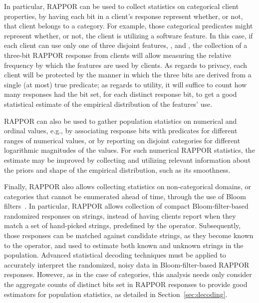 \documentclass{sig-alternate-2013}
\newcommand\RAPPOR{{RAPPOR}}
\begin{document}
In particular,
\RAPPOR{} can be used to
collect 
statistics on 
categorical client properties,
by having each bit in a client's response
represent whether, or not, that client belongs to a category.
For example, those categorical predicates 
might represent 
whether, or not, the client is utilizing a software feature.
In this case,
if each client can use only one of three disjoint features, , and , 
the collection of a three-bit \RAPPOR{} response from clients
will allow measuring
the relative frequency 
by which the features are used by clients.
As regards to privacy,
each client will be protected
by the manner in which 
the three bits are derived from a single (at most) true predicate;
as regards to utility,
it will suffice to count how many responses had the bit set, for each distinct response bit,
to get a good statistical estimate of the empirical distribution of the features' use.


\RAPPOR{}
can also be used to 
gather
population statistics on 
numerical and ordinal values,
e.g., 
by associating response bits
with predicates for different ranges of numerical values,
or by reporting on
disjoint categories for different logarithmic magnitudes of the values.
For such numerical \RAPPOR{} statistics,
the estimate may be improved
by collecting and utilizing
relevant information about the priors and shape of
the empirical distribution, such as its smoothness.


Finally,
\RAPPOR{}
also allows collecting statistics on
non-categorical domains, or categories that cannot be enumerated ahead of time,
through the use of Bloom filters~\cite{bloom}.
In particular, \RAPPOR{}
allows collection of compact Bloom-filter-based randomized responses on strings,
instead of 
having clients report
when they match a set of hand-picked strings, predefined by the operator.
Subsequently,
those responses can be matched against candidate strings, as they become known to the operator,
and used to estimate both known and unknown strings in the population.
Advanced statistical decoding techniques must be applied
to accurately interpret the randomized, noisy data in Bloom-filter-based \RAPPOR{} responses.
However, as in the case of categories,
this analysis needs only consider the aggregate counts of distinct bits set in \RAPPOR{} responses
to provide good estimators for population statistics,
as detailed in Section~\ref{sec:decoding}.
\end{document}
